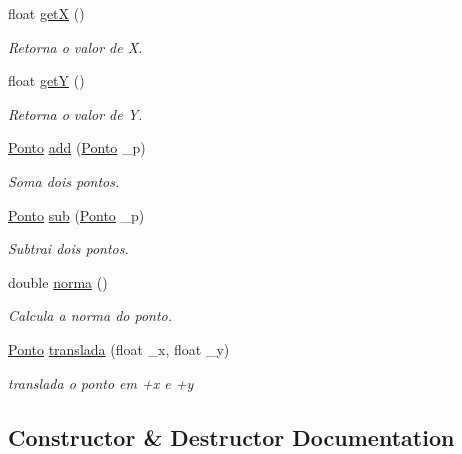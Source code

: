 \begin{DoxyCompactItemize}
float \mbox{\hyperlink{class_ponto_ae4823d6ee26ff3448ee403d26a3c6d2f}{getX}} ()
\begin{DoxyCompactList}\small\item\em Retorna o valor de X. \end{DoxyCompactList}\item 
float \mbox{\hyperlink{class_ponto_ab120600953e6544301223b9b05a43ee5}{getY}} ()
\begin{DoxyCompactList}\small\item\em Retorna o valor de Y. \end{DoxyCompactList}\item 
\mbox{\hyperlink{class_ponto}{Ponto}} \mbox{\hyperlink{class_ponto_ab53f257f937ed29a7ed5a1051014773f}{add}} (\mbox{\hyperlink{class_ponto}{Ponto}} \+\_\+p)
\begin{DoxyCompactList}\small\item\em Soma dois pontos. \end{DoxyCompactList}\item 
\mbox{\hyperlink{class_ponto}{Ponto}} \mbox{\hyperlink{class_ponto_a4c49d0e1863d645a6a8ac68c823b23bb}{sub}} (\mbox{\hyperlink{class_ponto}{Ponto}} \+\_\+p)
\begin{DoxyCompactList}\small\item\em Subtrai dois pontos. \end{DoxyCompactList}\item 
double \mbox{\hyperlink{class_ponto_aabf21d159fc5b233d5e58d06cc4a6b6c}{norma}} ()
\begin{DoxyCompactList}\small\item\em Calcula a norma do ponto. \end{DoxyCompactList}\item 
\mbox{\hyperlink{class_ponto}{Ponto}} \mbox{\hyperlink{class_ponto_a7e481afed576885a03c7a3db34df29fa}{translada}} (float \+\_\+x, float \+\_\+y)
\begin{DoxyCompactList}\small\item\em translada o ponto em +x e +y \end{DoxyCompactList}\end{DoxyCompactItemize}


\subsection{Constructor \& Destructor Documentation}
\mbox{\label{class_ponto_a49b03b00e9ebc01c2011c25f6517b93b}} 
